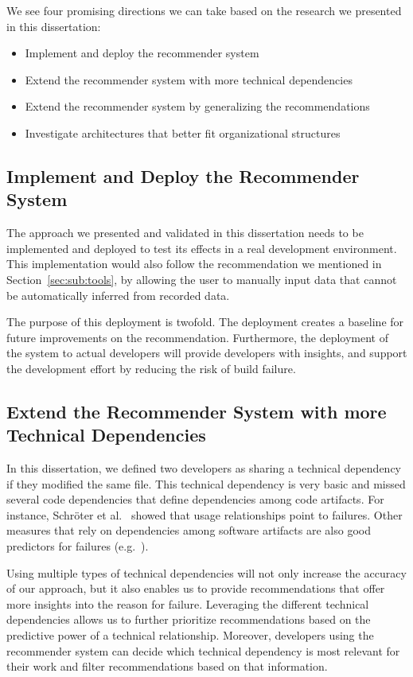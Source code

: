 We see four promising directions we can take based on the research we presented in this dissertation:
\begin{itemize}
\item Implement and deploy the recommender system
\item Extend the recommender system with more technical dependencies
\item Extend the recommender system by generalizing the recommendations
\item Investigate architectures that better fit organizational structures
\end{itemize}

\subsection{Implement and Deploy the Recommender System}
The approach we presented and validated in this dissertation needs to be implemented and deployed to test its effects in a real development environment.
This implementation would also follow the recommendation we mentioned in Section~\ref{sec:sub:tools}, by allowing the user to manually input data that cannot be automatically inferred from recorded data.

The purpose of this deployment is twofold.
The deployment creates a baseline for future improvements on the recommendation.
Furthermore, the deployment of the system to actual developers will provide developers with insights, and support the development effort by reducing the risk of build failure.



\subsection{Extend the Recommender System with more Technical Dependencies}
In this dissertation, we defined two developers as sharing a technical dependency if they modified the same file.
This technical dependency is very basic and missed several code dependencies that define dependencies among code artifacts.
For instance, Schr\"oter et al.~\cite{schroeter:isese:2006} showed that usage relationships point to failures.
Other measures that rely on dependencies among software artifacts are also good predictors for failures (e.g.~\cite{nagappan:icse:2006}).

Using multiple types of technical dependencies will not only increase the accuracy of our approach, but it also enables us to provide recommendations that offer more insights into the reason for failure.
Leveraging the different technical dependencies allows us to further prioritize recommendations based on the predictive power of a technical relationship.
Moreover, developers using the recommender system can decide which technical dependency is most relevant for their work and filter recommendations based on that information.

